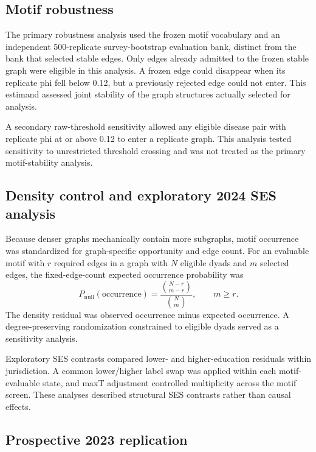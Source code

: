 \documentclass[11pt]{article}
\begin{document}
\subsection{Motif robustness}

The primary robustness analysis used the frozen motif vocabulary and an
independent 500-replicate survey-bootstrap evaluation bank, distinct from the
bank that selected stable edges. Only edges already admitted to the frozen
stable graph were eligible in this analysis. A frozen edge could disappear
when its replicate phi fell below 0.12, but a previously rejected edge could
not enter. This estimand assessed joint stability of the graph structures
actually selected for analysis.

A secondary raw-threshold sensitivity allowed any eligible disease pair with
replicate phi at or above 0.12 to enter a replicate graph. This analysis
tested sensitivity to unrestricted threshold crossing and was not treated as
the primary motif-stability analysis.

\subsection{Density control and exploratory 2024 SES analysis}

Because denser graphs mechanically contain more subgraphs, motif occurrence
was standardized for graph-specific opportunity and edge count. For an
evaluable motif with $r$ required edges in a graph with $N$ eligible dyads and
$m$ selected edges, the fixed-edge-count expected occurrence probability was
\begin{equation}
  P_{\mathrm{null}}(\mathrm{occurrence})
  =
  \frac{{N-r \choose m-r}}{{N \choose m}},
  \qquad m\ge r.
\end{equation}
The density residual was observed occurrence minus expected occurrence. A
degree-preserving randomization constrained to eligible dyads served as a
sensitivity analysis.

Exploratory SES contrasts compared lower- and higher-education residuals
within jurisdiction. A common lower/higher label swap was applied within each
motif-evaluable state, and maxT adjustment controlled multiplicity across the
motif screen. These analyses described structural SES contrasts rather than
causal effects.

\subsection{Prospective 2023 replication}
\end{document}
